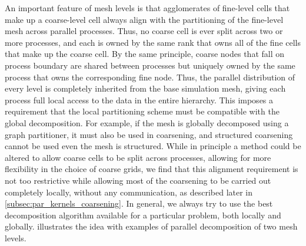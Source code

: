 An important feature of mesh levels is that agglomerates of fine-level cells that make up a coarse-level cell always align with the partitioning of the fine-level mesh across parallel processes.   Thus, no coarse cell is ever split across two or more processes, and each is owned by the same rank that owns all of the fine cells that make up the coarse cell.   By the same principle, coarse nodes that fall on process boundary are shared between processes but uniquely owned by the same process that owns the corresponding fine node.   Thus, the parallel distribution of every level is completely inherited from the base simulation mesh, giving each process full local access to the data in the entire hierarchy.   This imposes a requirement that the local partitioning scheme must be compatible with the global decomposition.   For example, if the mesh is globally decomposed using a graph partitioner, it must also be used in coarsening, and structured coarsening cannot be used even the mesh is structured.    While in principle a method could be altered to allow coarse cells to be split across processes, allowing for more flexibility in the choice of coarse grids, we find that this alignment requirement is not too restrictive while allowing most of the coarsening to be carried out completely locally, without any communication, as described later in \cref{subsec:par_kernels_coarsening}.   In general, we always try to use the best decomposition algorithm available for a particular problem, both locally and globally.    illustrates the idea with examples of parallel decomposition of two mesh levels.

